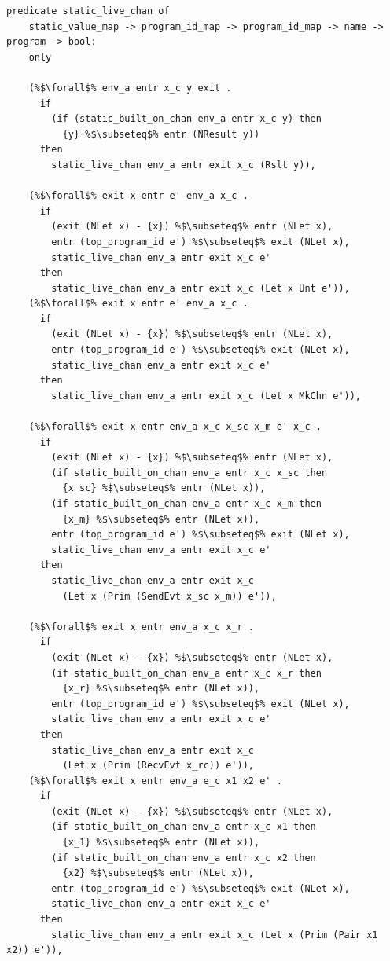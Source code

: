 \documentclass{article}
\begin{document}
\begin{lstlisting}[language=logic, escapechar=\%]
  predicate static_live_chan of
    static_value_map -> program_id_map -> program_id_map -> name -> program -> bool:
    only

    (%$\forall$% env_a entr x_c y exit .
      if
        (if (static_built_on_chan env_a entr x_c y) then
          {y} %$\subseteq$% entr (NResult y))
      then
        static_live_chan env_a entr exit x_c (Rslt y)),

    (%$\forall$% exit x entr e' env_a x_c .
      if 
        (exit (NLet x) - {x}) %$\subseteq$% entr (NLet x),
        entr (top_program_id e') %$\subseteq$% exit (NLet x),
        static_live_chan env_a entr exit x_c e'
      then 
        static_live_chan env_a entr exit x_c (Let x Unt e')),
    (%$\forall$% exit x entr e' env_a x_c .
      if
        (exit (NLet x) - {x}) %$\subseteq$% entr (NLet x),
        entr (top_program_id e') %$\subseteq$% exit (NLet x),
        static_live_chan env_a entr exit x_c e'
      then 
        static_live_chan env_a entr exit x_c (Let x MkChn e')),

    (%$\forall$% exit x entr env_a x_c x_sc x_m e' x_c .
      if
        (exit (NLet x) - {x}) %$\subseteq$% entr (NLet x),
        (if static_built_on_chan env_a entr x_c x_sc then
          {x_sc} %$\subseteq$% entr (NLet x)),
        (if static_built_on_chan env_a entr x_c x_m then 
          {x_m} %$\subseteq$% entr (NLet x)),
        entr (top_program_id e') %$\subseteq$% exit (NLet x),
        static_live_chan env_a entr exit x_c e'
      then
        static_live_chan env_a entr exit x_c
          (Let x (Prim (SendEvt x_sc x_m)) e')),

    (%$\forall$% exit x entr env_a x_c x_r .    
      if
        (exit (NLet x) - {x}) %$\subseteq$% entr (NLet x),
        (if static_built_on_chan env_a entr x_c x_r then
          {x_r} %$\subseteq$% entr (NLet x)),
        entr (top_program_id e') %$\subseteq$% exit (NLet x),
        static_live_chan env_a entr exit x_c e'
      then
        static_live_chan env_a entr exit x_c
          (Let x (Prim (RecvEvt x_rc)) e')),
    (%$\forall$% exit x entr env_a e_c x1 x2 e' .
      if
        (exit (NLet x) - {x}) %$\subseteq$% entr (NLet x),
        (if static_built_on_chan env_a entr x_c x1 then
          {x_1} %$\subseteq$% entr (NLet x)),
        (if static_built_on_chan env_a entr x_c x2 then
          {x2} %$\subseteq$% entr (NLet x)),
        entr (top_program_id e') %$\subseteq$% exit (NLet x),
        static_live_chan env_a entr exit x_c e'
      then
        static_live_chan env_a entr exit x_c (Let x (Prim (Pair x1 x2)) e')),


\end{lstlisting}
\end{document}
